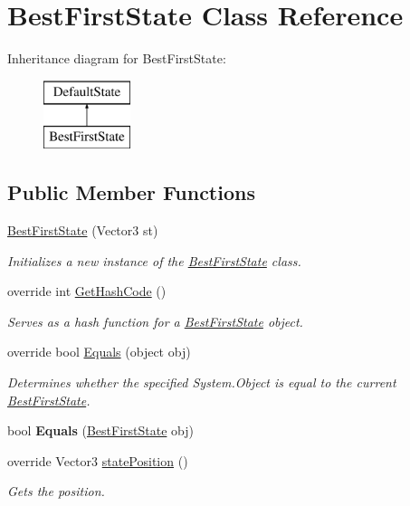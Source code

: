 \hypertarget{class_best_first_state}{\section{Best\-First\-State Class Reference}
\label{class_best_first_state}
}
Inheritance diagram for Best\-First\-State\-:\begin{figure}[H]
\begin{center}
\leavevmode
\includegraphics[height=2.000000cm]{class_best_first_state}
\end{center}
\end{figure}
\subsection*{Public Member Functions}
\begin{DoxyCompactItemize}
\item 
\hyperlink{class_best_first_state_a0704eec1c8b220625518dd2089247608}{Best\-First\-State} (Vector3 st)
\begin{DoxyCompactList}\small\item\em Initializes a new instance of the \hyperlink{class_best_first_state}{Best\-First\-State} class. \end{DoxyCompactList}\item 
override int \hyperlink{class_best_first_state_a3353f52b010a1c812b28f58134a3c7bb}{Get\-Hash\-Code} ()
\begin{DoxyCompactList}\small\item\em Serves as a hash function for a \hyperlink{class_best_first_state}{Best\-First\-State} object. \end{DoxyCompactList}\item 
override bool \hyperlink{class_best_first_state_a286520962ee94165281a2a8f348761ce}{Equals} (object obj)
\begin{DoxyCompactList}\small\item\em Determines whether the specified System.\-Object is equal to the current \hyperlink{class_best_first_state}{Best\-First\-State}. \end{DoxyCompactList}\item 
\hypertarget{class_best_first_state_aeecb81a2451e5b056a7a4b1cf4c2bbee}{bool {\bfseries Equals} (\hyperlink{class_best_first_state}{Best\-First\-State} obj)}\label{class_best_first_state_aeecb81a2451e5b056a7a4b1cf4c2bbee}

\item 
override Vector3 \hyperlink{class_best_first_state_a3d992e4922c88ef7d34b41598ac888a8}{state\-Position} ()
\begin{DoxyCompactList}\small\item\em Gets the position. \end{DoxyCompactList}\end{DoxyCompactItemize}
